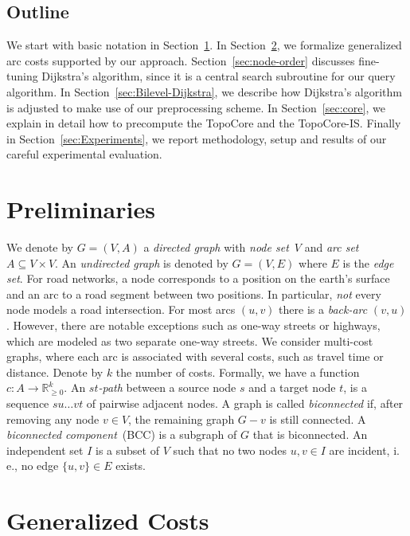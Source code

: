 \documentclass{sig-alternate}
\newcommand{\ie}{i.\,e.\xspace}
\newcommand{\arccost}{\ensuremath{c}}
\begin{document}
\subsection{Outline}

We start with basic notation in Section~\ref{sec:prelim}.
In Section~\ref{sec:costs}, we formalize generalized arc costs supported by our approach.
Section~\ref{sec:node-order} discusses fine-tuning
Dijkstra's algorithm, since it is a central search subroutine for our query algorithm. 
In Section~\ref{sec:Bilevel-Dijkstra}, we describe how Dijkstra's algorithm is adjusted to make use of our preprocessing scheme. In Section~\ref{sec:core}, we explain in detail how to precompute the TopoCore and the TopoCore-IS. 
Finally in Section~\ref{sec:Experiments}, we report
methodology, setup and results of our careful experimental evaluation.

\section{Preliminaries}\label{sec:prelim}

We denote by $G=(V,A)$ a \emph{directed graph} with \emph{node set}~$V$ and \emph{arc set} $A\subseteq V\times V$. 
An \emph{undirected graph} is denoted by $G=(V,E)$ where $E$ is the \emph{edge set}.
 For road networks,
a node corresponds to a position on the earth's surface and an arc
to a road segment between two positions. In particular, \emph{not} every node
models a road intersection. For most arcs $(u,v)$ there is a \emph{back-arc}
$(v,u)$. However, there are notable exceptions such as one-way streets
or highways, which are modeled as two separate one-way streets. 
We consider multi-cost graphs, where each arc is associated with several costs, such as travel time
or distance. Denote by $k$ the number of costs. Formally, we have
a function $\arccost:A\rightarrow\mathbb{R}_{\ge0}^{k}$.
An \emph{$st$-path}  between a source node $s$ and a target node $t$, is a sequence $su\ldots vt$ of pairwise adjacent nodes.
A graph is called \emph{biconnected} if, after removing any node $v\in V$, the remaining graph $G-v$ is still connected.
A \emph{biconnected component}~(BCC) is a subgraph of $G$ that
is biconnected. An independent set $I$ is a subset of $V$ such that
no two nodes $u,v\in I$ are incident, \ie, no edge $\{u,v\}\in E$ exists.



\section{Generalized Costs}\label{sec:costs}
\end{document}
